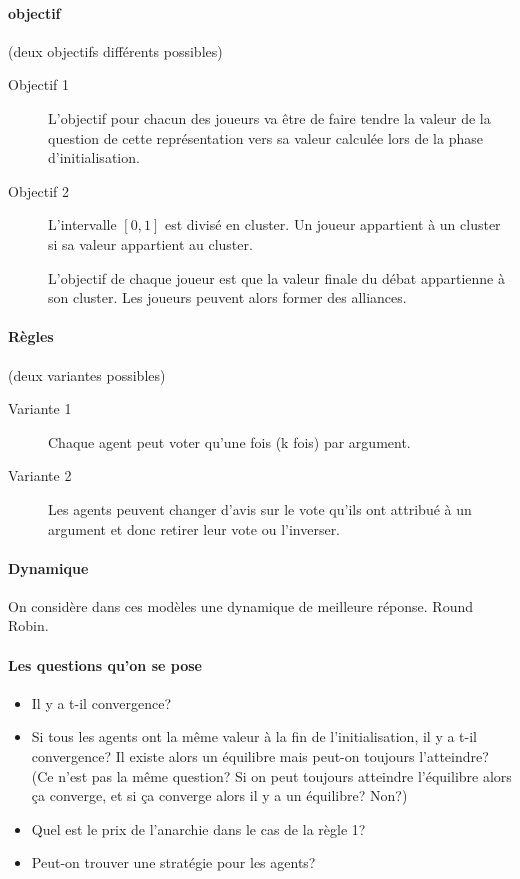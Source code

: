 \documentclass[12pt]{article}
\theoremstyle{defi}
\theoremstyle{not}
\theoremstyle{prob}
\begin{document}
    \paragraph{objectif}(deux objectifs différents possibles)
      \begin{description}
        \item[Objectif 1] L'objectif pour chacun des joueurs va être de faire tendre la valeur de la question de cette représentation vers sa valeur calculée lors de la phase d'initialisation.
        \item[Objectif 2] L'intervalle $[0, 1]$ est divisé en cluster. Un joueur appartient à un cluster si sa valeur appartient au cluster.

        L'objectif de chaque joueur est que la valeur finale du débat appartienne à son cluster. Les joueurs peuvent alors former des alliances.
      \end{description}


    \paragraph{Règles}(deux variantes possibles)
      \begin{description}
        \item[Variante 1] Chaque agent peut voter qu'une fois (k fois) par argument.

        \item[Variante 2] Les agents peuvent changer d'avis sur le vote qu'ils ont attribué à un argument et donc retirer leur vote ou l'inverser.
      \end{description}

    \paragraph{Dynamique\\}
      On considère dans ces modèles une dynamique de meilleure réponse. Round Robin.

    \paragraph{Les questions qu'on se pose}
      \begin{itemize}
        \item Il y a t-il convergence?
        \item Si tous les agents ont la même valeur à la fin de l'initialisation, il y a t-il convergence? Il existe alors un équilibre mais peut-on toujours l'atteindre? (Ce n'est pas la même question? Si on peut toujours atteindre l'équilibre alors ça converge, et si ça converge alors il y a un équilibre? Non?)
        \item Quel est le prix de l'anarchie dans le cas de la règle 1?
        \item Peut-on trouver une stratégie pour les agents?
      \end{itemize}
\end{document}
